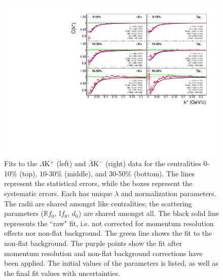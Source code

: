 \documentclass[../AnalysisNoteJBuxton.tex]{subfiles}
\begin{document}
\begin{figure}[h]
  \centering
  \includegraphics[width=\textwidth]{7_ResultsAndDiscussion/Figures/canKStarCfwFitsLamKchPwConj_0010_1030_3050_MomResCrctn_NonFlatBgdCrctn.pdf}
  \caption[$\Lambda$K$^{+}$($\bar{\Lambda}$K$^{-}$) Fits]{Fits to the $\Lambda$K$^{+}$ (left) and $\bar{\Lambda}$K$^{-}$ (right) data for the centralities 0-10\% (top), 10-30\% (middle), and 30-50\% (bottom).
The lines represent the statistical errors, while the boxes represent the systematic errors.  
Each has unique $\lambda$ and normalization parameters.
The radii are shared amongst like centralities; the scattering parameters ($\mathbb{R}f_{0}$, $\mathbb{I}f_{0}$, $d_{0}$) are shared amongst all.
The black solid line represents the ``raw" fit, i.e. not corrected for momentum resolution effects nor non-flat background.  
The green line shows the fit to the non-flat background.
The purple points show the fit after momentum resolution and non-flat background corrections have been applied.
The initial values of the parameters is listed, as well as the final fit values with uncertainties.}
  \label{fig:LamKchPwConjFits}
\end{figure}
\end{document}
